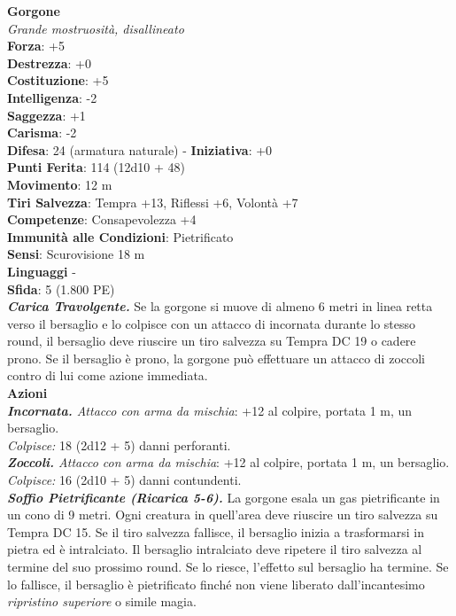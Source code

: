 \begin{multicols}{2}
\medskip\textbf{Gorgone}\\
\emph{Grande mostruosità, disallineato}\\
\textbf{Forza}: +5\\
\textbf{Destrezza}: +0\\
\textbf{Costituzione}: +5\\
\textbf{Intelligenza}: -2\\
\textbf{Saggezza}: +1\\
\textbf{Carisma}: -2\\
\textbf{Difesa}: 24 (armatura naturale) - \textbf{Iniziativa}: +0\\
\textbf{Punti Ferita}: 114 (12d10 + 48)\\
\textbf{Movimento}: 12 m\\
\textbf{Tiri Salvezza}: Tempra +13, Riflessi +6, Volontà +7\\
\textbf{Competenze}: Consapevolezza +4\\
\textbf{Immunità alle Condizioni}: Pietrificato\\
\textbf{Sensi}: Scurovisione 18 m\\
\textbf{Linguaggi} -\\
\textbf{Sfida}: 5 (1.800 PE)\smallskip\\
\emph{\textbf{Carica Travolgente.}} Se la gorgone si muove di almeno 6 metri in linea retta verso il bersaglio e lo colpisce con un attacco di incornata durante lo stesso round, il bersaglio deve riuscire un tiro salvezza su Tempra DC  19 o cadere prono. Se il bersaglio è prono, la gorgone può effettuare un attacco di zoccoli contro di lui come azione immediata.\\
\smallskip\textbf{Azioni}\\
\emph{\textbf{Incornata.} Attacco con arma da mischia}: +12 al colpire, portata 1 m, un bersaglio.\\
\emph{Colpisce:} 18 (2d12 + 5) danni perforanti.\\
\emph{\textbf{Zoccoli.} Attacco con arma da mischia}: +12 al colpire, portata 1 m, un bersaglio.\\
\emph{Colpisce:} 16 (2d10 + 5) danni contundenti.\\
\emph{\textbf{Soffio Pietrificante (Ricarica 5-6).}} La gorgone esala un gas pietrificante in un cono di 9 metri. Ogni creatura in quell'area deve riuscire un tiro salvezza su Tempra DC  15. Se il tiro salvezza fallisce, il bersaglio inizia a trasformarsi in pietra ed è intralciato. Il bersaglio intralciato deve ripetere il tiro salvezza al termine del suo prossimo round. Se lo riesce, l'effetto sul bersaglio ha termine. Se lo fallisce, il bersaglio è pietrificato finché non viene liberato dall'incantesimo \emph{ripristino superiore} o simile magia.\\

\end{multicols}
